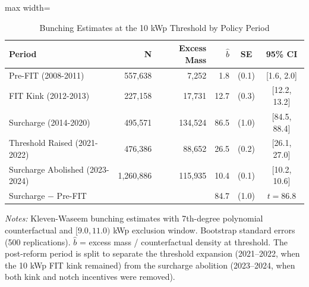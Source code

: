 \begin{table}[t]
\centering
\caption{Bunching Estimates at the 10 kWp Threshold by Policy Period}
\label{tab:bunching}
\begin{adjustbox}{max width=\textwidth}
\begin{tabular}{lrrrcc}
\toprule
Period & N & Excess Mass & $\hat{b}$ & SE & 95\% CI \\
\midrule
Pre-FIT (2008-2011) & 557,638 & 7,252 & 1.8 & (0.1) & [1.6, 2.0] \\
FIT Kink (2012-2013) & 227,158 & 17,731 & 12.7 & (0.3) & [12.2, 13.2] \\
Surcharge (2014-2020) & 495,571 & 134,524 & 86.5 & (1.0) & [84.5, 88.4] \\
Threshold Raised (2021-2022) & 476,386 & 88,652 & 26.5 & (0.2) & [26.1, 27.0] \\
Surcharge Abolished (2023-2024) & 1,260,886 & 115,935 & 10.4 & (0.1) & [10.2, 10.6] \\
\midrule
Surcharge $-$ Pre-FIT & & & 84.7 & (1.0) & $t = 86.8$ \\
\bottomrule
\end{tabular}
\end{adjustbox}

\begin{flushleft}\small \textit{Notes:} Kleven-Waseem bunching estimates with 7th-degree polynomial counterfactual and $[9.0, 11.0)$ kWp exclusion window. Bootstrap standard errors (500 replications). $\hat{b}$ = excess mass / counterfactual density at threshold. The post-reform period is split to separate the threshold expansion (2021--2022, when the 10 kWp FIT kink remained) from the surcharge abolition (2023--2024, when both kink and notch incentives were removed).\end{flushleft}
\end{table}

